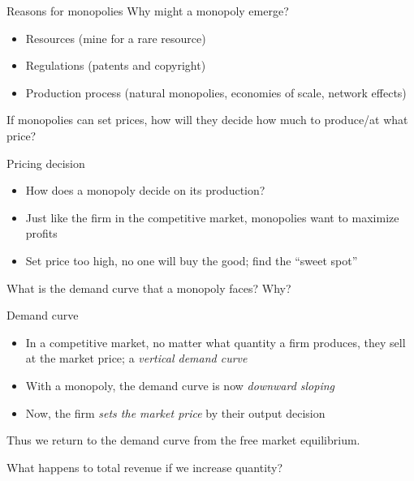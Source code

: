\documentclass[aspectratio=169]{beamer}
\begin{document}
\begin{frame}{Reasons for monopolies}
    Why might a monopoly emerge?

    \vspace{2mm}

    \begin{itemize}
        \item Resources (mine for a rare resource)
        \item Regulations (patents and copyright)
        \item Production process (natural monopolies, economies of scale, network effects)
    \end{itemize}

    If monopolies can set prices, how will they decide how much to produce/at what price?
\end{frame}

\begin{frame}{Pricing decision}
    \begin{itemize}
        \item How does a monopoly decide on its production?
        \item Just like the firm in the competitive market, monopolies want to maximize profits
        \item Set price too high, no one will buy the good; find the ``sweet spot''
    \end{itemize}

    \vspace{2mm}

    What is the demand curve that a monopoly faces? Why?
\end{frame}

\begin{frame}{Demand curve}
    \begin{itemize}
         \item In a competitive market, no matter what quantity a firm produces, they sell at the market price; a \textit{vertical demand curve}
         \item With a monopoly, the demand curve is now \textit{downward sloping}
        \item Now, the firm \textit{sets the market price} by their output decision
    \end{itemize}

    \vspace{5mm}

    Thus we return to the demand curve from the free market equilibrium.

    \vspace{2mm}

    What happens to total revenue if we increase quantity?
\end{frame}
\end{document}
